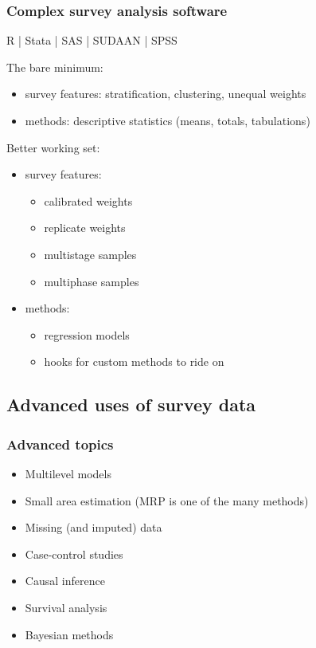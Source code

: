 \documentclass[handout]{beamer}
\begin{document}
\begin{frame}\frametitle{Complex survey analysis software}

R | Stata | SAS | SUDAAN | SPSS

\bigskip

The bare minimum:
\begin{itemize}
    \item survey features: stratification, clustering, unequal weights
    \item methods: descriptive statistics (means, totals, tabulations)
\end{itemize}

Better working set:
\begin{itemize}
    \item survey features:
    \begin{itemize}
        \item calibrated weights
        \item replicate weights
        \item multistage samples
        \item multiphase samples
    \end{itemize}
    \item methods:
    \begin{itemize}
        \item regression models
        \item hooks for custom methods to ride on
    \end{itemize}
\end{itemize}

\end{frame}



\subsection{Advanced uses of survey data}

\begin{frame}\frametitle{Advanced topics}

\begin{itemize}
    \item Multilevel models
    \item Small area estimation (MRP is one of the many methods)
    \item Missing (and imputed) data
    \item Case-control studies
    \item Causal inference
    \item Survival analysis
    \item Bayesian methods
\end{itemize}

\end{frame}
\end{document}
